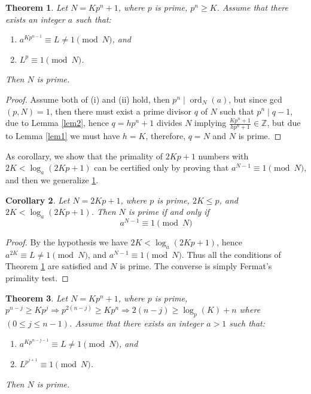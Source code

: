 \documentclass{amsart}
\newtheorem{theorem}{Theorem}[section]
\newtheorem{corollary}[theorem]{Corollary}
\numberwithin{equation}{section}
\DeclareMathOperator{\ord}{ord}
\begin{document}
\begin{theorem}\label{main}
	Let $N=Kp^n+1$, where $p$ is prime, $p^n \ge K$. Assume that there exists an integer $a$ such that:
	\begin{enumerate}
		\item[(i)] $a^{Kp^{n-1}} \equiv L \neq 1 \pmod N$, and
		\item[(ii)] $L^p \equiv 1 \pmod N$.
	\end{enumerate} 
	Then $N$ is prime.
\end{theorem} 

\begin{proof}
	Assume both of (i) and (ii) hold, then $p^n \mid \ord_N(a)$, but since gcd$(p,N)=1$, then there must exist a prime divisor $q$ of $N$ such that $p^n \mid q-1$, due to Lemma \ref{lem2}, hence $q=hp^n+1$ divides $N$ implying  $\frac{Kp^n+1}{hp^n+1}\in \mathbb{Z}$, but due to Lemma \ref{lem1} we must have $h=K$, therefore, $q=N$ and $N$ is prime.
\end{proof}

As corollary, we show that the primality of $2Kp+1$ numbers with $2K < \log_{a}(2Kp+1)$ can be certified only by proving that $a^{N-1} \equiv 1 \pmod N$, and then we generalize \ref{main}.

\begin{corollary}\label{cor24} Let $N=2Kp+1$, where $p$ is prime, $2K \leq p$, and $2K < \log_{a}(2Kp+1)$. Then $N$ is prime if and only if
	\begin{equation} 
		a^{N-1} \equiv 1 \pmod N 
	\end{equation}
	
\end{corollary}

\begin{proof}
	By the hypothesis we have $2K < \log_{a}(2Kp+1)$, hence $a^{2K} \equiv L \neq 1 \pmod N $, and $a^{N-1} \equiv 1 \pmod N$. Thus all the conditions of Theorem \ref{main} are satisfied and $N$ is prime. The converse is simply Fermat's primality test.
\end{proof}

\begin{theorem}\label{thm2} Let $N=Kp^n+1$, where $p$ is prime, $p^{n-j} \ge Kp^{j} \Longrightarrow p^{2(n-j)} \ge Kp^n \Longrightarrow 2(n-j) \geq \log_{p}(K)+n$ where $(0 \leq j \leq n-1)$. Assume that there exists an integer $a>1$ such that: 
	\begin{enumerate}
		\item[(i)] $a^{Kp^{n-j-1}} \equiv L \neq 1 \pmod N$, and
		\item[(ii)] $L^{p^{j+1}} \equiv 1 \pmod N$.
	\end{enumerate}
	Then $N$ is prime. 
\end{theorem}
\end{document}
